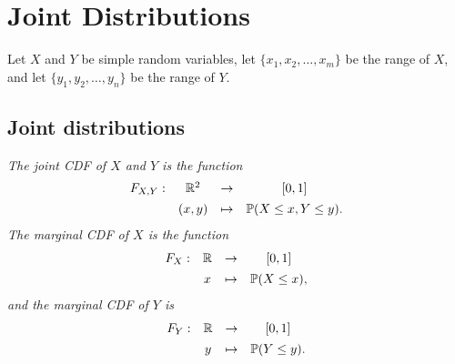 \chapter{Joint Distributions}\label{chap:joint}

Let $X$ and $Y$ be simple random variables, let $\{x_1,x_2,\ldots,x_m\}$ be the range of $X$, and let $\{y_1,y_2,\ldots,y_n\}$ be the range of $Y$.

\section{Joint distributions}
\begin{definition}
\ben
\it The \emph{joint CDF} of $X$ and $Y$ is the function
\[
\begin{array}{cccc}
F_{X,Y}:	& \mathbb{R}^2	& \to		& [0,1] \\[1ex]
			& (x,y) & \mapsto	& \mathbb{P}(X\leq x, Y\leq y).
\end{array}
\]
\it The \emph{marginal CDF} of $X$ is the function
\[
\begin{array}{cccc}
F_X:	& \mathbb{R} 	& \to		& [0,1] \\[1ex]
		& x				& \mapsto	& \mathbb{P}(X\leq x),
\end{array}
\]
and the marginal CDF of $Y$ is
\[
\begin{array}{cccc}
F_Y:	& \mathbb{R}	& \to		& [0,1] \\[1ex]
		& y				& \mapsto	& \mathbb{P}(Y\leq y).
\end{array}
\]

\een
\end{definition}

